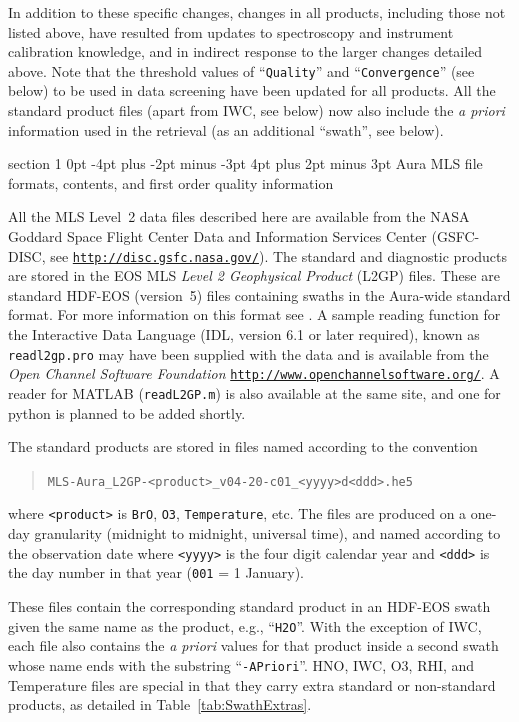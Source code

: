 \documentclass[11pt,draft]{report}
\makeatletter
\renewcommand{\section}{\@startsection%
  {section}%
  {1}%
  {0pt}%
  {-4pt plus -2pt minus -3pt}%
  {4pt plus 2pt minus 3pt}%
  {\Large\sffamily\fontseries{sb}\selectfont\flushleft\color{SectionColor}\figureversion{tabular}}}%
\makeatother
\begin{document}
In addition to these specific changes, changes in all products,
including those not listed above, have resulted from updates to
spectroscopy and instrument calibration knowledge, and in indirect
response to the larger changes detailed above.  Note that the threshold
values of ``\texttt{Quality}'' and ``\texttt{Convergence}'' (see below)
to be used in data screening have been updated for all products.  All
the standard product files (apart from IWC, see below) now also include
the \emph{a priori} information used in the retrieval (as an additional
``swath'', see below).

\section{Aura MLS file formats, contents, and first order
  quality information}
\label{sec:FilesAndFormats}
\label{sec:NegativePrecision}

All the MLS Level~2 data files described here are available from the
NASA Goddard Space Flight Center Data and Information Services Center
(GSFC-DISC, see
\href{http://disc.gsfc.nasa.gov/}{\texttt{http://disc.gsfc.nasa.gov/}}).
The standard and diagnostic products are stored in the EOS MLS
\emph{Level 2 Geophysical Product} (L2GP) files.  These are standard
HDF-EOS (version~5) files containing swaths in the Aura-wide standard
format.  For more information on this format see
\citet{AuraFileConventions}.  A sample reading function for the
Interactive Data Language (IDL, version 6.1 or later required), known as
\texttt{readl2gp.pro} may have been supplied with the data and is
available from the \emph{Open Channel Software Foundation}
\href{http://www.openchannelsoftware.org/}{\texttt{http://www.openchannelsoftware.org/}}.
A reader for MATLAB (\texttt{readL2GP.m}) is also available at the same
site, and one for python is planned to be added shortly.

The standard products are stored in files named according to the convention
\begin{quote}
\verb+MLS-Aura_L2GP-<product>_v04-20-c01_<yyyy>d<ddd>.he5+
\end{quote}
where \verb+<product>+ is \texttt{BrO}, \texttt{O3},
\texttt{Temperature}, etc.  The files are produced on a one-day
granularity (midnight to midnight, universal time), and named according
to the observation date where \verb+<yyyy>+ is the four digit calendar
year and \verb+<ddd>+ is the day number in that year (\texttt{001} = 1
January).

These files contain the corresponding standard product in an HDF-EOS
swath given the same name as the product, e.g., ``\texttt{H2O}''.  With the
exception of IWC, each file also contains the \emph{a priori} values for that
product inside a second swath whose name ends with the substring
``\texttt{-APriori}''. HNO, IWC, O3, RHI, and Temperature files are special in
that they carry extra standard or non-standard products, as detailed in
Table~\ref{tab:SwathExtras}.
\end{document}
